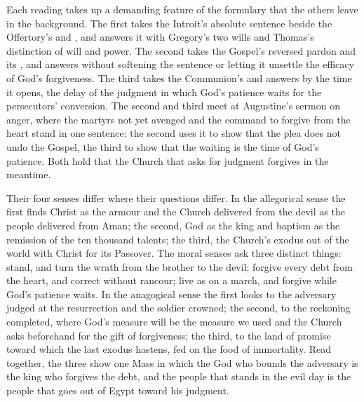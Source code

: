 Each reading takes up a demanding feature of the formulary that the others leave
in the background. The first takes the Introit's absolute sentence beside the
Offertory's  and , and answers it
with Gregory's two wills and Thomas's distinction of will and power. The second
takes the Gospel's reversed pardon and its , and answers
without softening the sentence or letting it unsettle the efficacy of God's
forgiveness. The third takes the Communion's  and answers by the
time it opens, the delay of the judgment in which God's patience waits for the
persecutors' conversion. The second and third meet at Augustine's sermon on
anger, where the martyrs not yet avenged and the command to forgive from the heart
stand in one sentence: the second uses it to show that the plea does not undo the
Gospel, the third to show that the waiting is the time of God's patience. Both
hold that the Church that asks for judgment forgives in the meantime.

Their four senses differ where their questions differ. In the allegorical sense
the first finds Christ as the armour and the Church delivered from the devil as
the people delivered from Aman; the second, God as the king and baptism as the
remission of the ten thousand talents; the third, the Church's exodus out of the
world with Christ for its Passover. The moral senses ask three distinct things:
stand, and turn the wrath from the brother to the devil; forgive every debt from
the heart, and correct without rancour; live as on a march, and forgive while
God's patience waits. In the anagogical sense the first looks to the adversary
judged at the resurrection and the soldier crowned; the second, to the reckoning
completed, where God's measure will be the measure we used and the Church asks
beforehand for the gift of forgiveness; the third, to the land of promise toward
which the last exodus hastens, fed on the food of immortality. Read together, the
three show one Mass in which the God who bounds the adversary is the king who
forgives the debt, and the people that stands in the evil day is the people that
goes out of Egypt toward his judgment.
